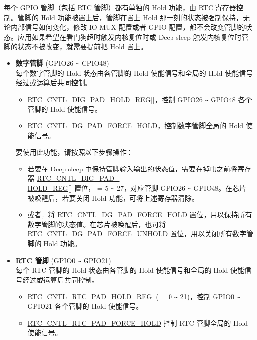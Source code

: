 \documentclass[main\_\_CN.tex]{subfiles}
\begin{document}
每个 GPIO 管脚（包括 RTC 管脚）都有单独的 Hold 功能，由 RTC 寄存器控制。管脚的 Hold 功能被置上后，管脚在置上 Hold 那一刻的状态被强制保持，无论内部信号如何变化，修改 IO MUX 配置或者 GPIO 配置，都不会改变管脚的状态。应用如果希望在看门狗超时触发内核复位时或 Deep-sleep 触发内核复位时管脚的状态不被改变，就需要提前把 Hold 置上。

\begin{itemize}
    \item \textbf{数字管脚} (GPIO26 \verb+~+ GPIO48)\\
    每个数字管脚的 Hold 状态由各管脚的 Hold 使能信号和全局的 Hold 使能信号经过或运算后共同控制。
    \begin{itemize}
    \item \hyperref[regdesc:RTCCNTLDIGPADHOLDREG] {RTC\_CNTL\_DIG\_PAD\_HOLD\_REG[]}，控制 GPIO26 \verb+~+ GPIO48 各个管脚的 Hold 使能信号。
    \item \hyperref[fielddesc:RTCCNTLDGPADFORCEHOLD]{RTC\_CNTL\_DG\_PAD\_FORCE\_HOLD}，控制数字管脚全局的 Hold 使能信号。
\end{itemize}
要使用此功能，请按照以下步骤操作：
\begin{itemize}
        \item 若要在 Deep-sleep 中保持管脚输入输出的状态值，需要在掉电之前将寄存器 \hyperref[regdesc:RTCCNTLDIGPADHOLDREG] {RTC\_CNTL\_DIG\_PAD\_\\HOLD\_REG[]} 置位， = 5 \verb+~+ 27，对应管脚 GPIO26 \verb+~+ GPIO48。在芯片被唤醒后，若要关闭 Hold 功能，可将上述寄存器清除。
        \item 或者，将 \hyperref[fielddesc:RTCCNTLDGPADFORCEHOLD]{RTC\_CNTL\_DG\_PAD\_FORCE\_HOLD} 置位，用以保持所有数字管脚的状态值。在芯片被唤醒后，也可将 \hyperref[fielddesc:RTCCNTLDGPADFORCEUNHOLD]{RTC\_CNTL\_DG\_PAD\_FORCE\_UNHOLD} 置位，用以关闭所有数字管脚的 Hold 功能。
    \end{itemize}
\item \textbf{RTC 管脚} (GPIO0 \verb+~+ GPIO21)\\
    每个 RTC 管脚的 Hold 状态由各管脚的 Hold 使能信号和全局的 Hold 使能信号经过或运算后共同控制。
    \begin{itemize}
    \item \hyperref[regdesc:RTCCNTLRTCPADHOLDREG]{RTC\_CNTL\_RTC\_PAD\_HOLD\_REG[]}( = 0 \verb+~+ 21)，控制 GPIO0 \verb+~+ GPIO21 各个管脚的 Hold 使能信号。
    \item \hyperref[fielddesc:RTCCNTLRTCPADFORCEHOLD]{RTC\_CNTL\_RTC\_PAD\_FORCE\_HOLD} 控制 RTC 管脚全局的 Hold 使能信号。
\end{itemize}


\end{itemize}
\end{document}
